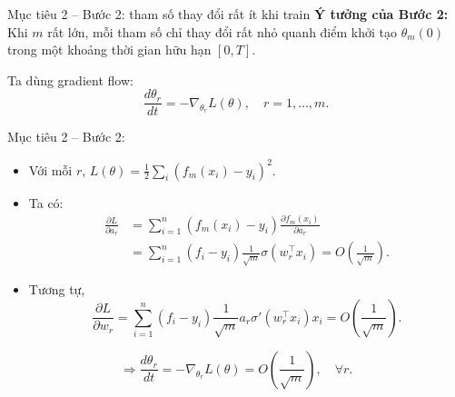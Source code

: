 \documentclass[12pt]{beamer}
\begin{document}
\begin{frame}{Mục tiêu 2 – Bước 2: tham số thay đổi rất ít khi train}
  \textbf{Ý tưởng của Bước 2:}  
  Khi $m$ rất lớn, mỗi tham số chỉ thay đổi rất nhỏ quanh điểm khởi tạo
  $\theta_m(0)$ trong một khoảng thời gian hữu hạn $[0,T]$.

  \vspace{0.2cm}
  Ta dùng gradient flow:
  \[
    \frac{d\theta_r}{dt}
    = -\nabla_{\theta_r}L(\theta),
    \quad r = 1,\dots,m.
  \]
\end{frame}
\begin{frame}{Mục tiêu 2 – Bước 2:}
  \begin{itemize}
    \item Với mỗi $r$, $L(\theta) = \tfrac12\sum_i (f_m(x_i)-y_i)^2$.
\item Ta có:
\[
\begin{aligned}
\frac{\partial L}{\partial a_r}
&= \sum_{i=1}^n (f_m(x_i)-y_i)
      \frac{\partial f_m(x_i)}{\partial a_r} \\
&= \sum_{i=1}^n (f_i-y_i)\frac{1}{\sqrt{m}}\sigma(w_r^\top x_i)
 = O\!\left(\frac{1}{\sqrt{m}}\right).
\end{aligned}
\]

    \item Tương tự,
      \[
        \frac{\partial L}{\partial w_r}
        = \sum_{i=1}^n (f_i-y_i)
            \frac{1}{\sqrt{m}} a_r \sigma'(w_r^\top x_i)x_i
        = O\!\left(\frac{1}{\sqrt{m}}\right).
      \]
  \end{itemize}

  \[ \Rightarrow
    \frac{d\theta_r}{dt}
    = -\nabla_{\theta_r}L(\theta)
    = O\!\left(\frac{1}{\sqrt{m}}\right),
    \quad \forall r.
  \]
\end{frame}
\end{document}
